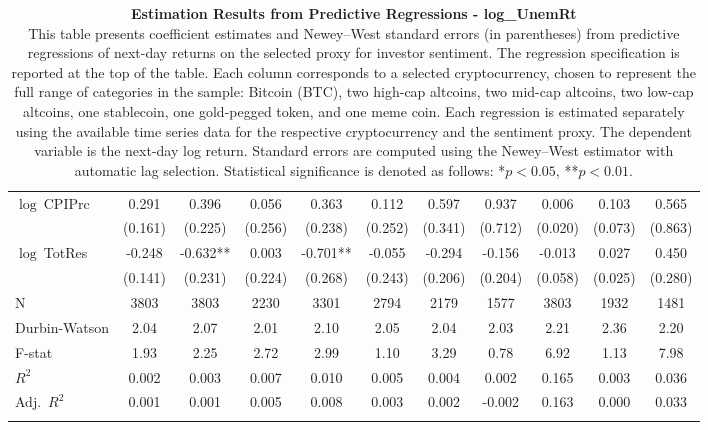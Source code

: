 \begin{table}[ht]
\begin{tabular}{l *{10}{c}}
\addlinespace
$\log\ $CPIPrc & 0.291 & 0.396 & 0.056 & 0.363 & 0.112 & 0.597 & 0.937 & 0.006 & 0.103 & 0.565 \\
 & (0.161) & (0.225) & (0.256) & (0.238) & (0.252) & (0.341) & (0.712) & (0.020) & (0.073) & (0.863) \\
\addlinespace
$\log\ $TotRes & -0.248 & -0.632** & 0.003 & -0.701** & -0.055 & -0.294 & -0.156 & -0.013 & 0.027 & 0.450 \\
 & (0.141) & (0.231) & (0.224) & (0.268) & (0.243) & (0.206) & (0.204) & (0.058) & (0.025) & (0.280) \\
\addlinespace
\midrule
N & 3803 & 3803 & 2230 & 3301 & 2794 & 2179 & 1577 & 3803 & 1932 & 1481 \\
Durbin-Watson & 2.04 & 2.07 & 2.01 & 2.10 & 2.05 & 2.04 & 2.03 & 2.21 & 2.36 & 2.20 \\
F-stat & 1.93 & 2.25 & 2.72 & 2.99 & 1.10 & 3.29 & 0.78 & 6.92 & 1.13 & 7.98 \\
\(R^2\) & 0.002 & 0.003 & 0.007 & 0.010 & 0.005 & 0.004 & 0.002 & 0.165 & 0.003 & 0.036 \\
Adj.\ \(R^2\) & 0.001 & 0.001 & 0.005 & 0.008 & 0.003 & 0.002 & -0.002 & 0.163 & 0.000 & 0.033 \\
\addlinespace
\midrule
\multicolumn{11}{c}{Specification tested: $R_{i,t+1} = \alpha_i + \beta_{sent} S_t + \phi R_{i,t} + \theta B_{i,t} + \gamma M_t + \varepsilon_{i,t+1}$}\\
\bottomrule
\end{tabular}
\caption{\textbf{Estimation Results from Predictive Regressions - log_UnemRt} \\
This table presents coefficient estimates and Newey--West standard errors (in parentheses) from predictive regressions of next-day returns on the selected proxy for investor sentiment. The regression specification is reported at the top of the table. Each column corresponds to a selected cryptocurrency, chosen to represent the full range of categories in the sample: Bitcoin (BTC), two high-cap altcoins, two mid-cap altcoins, two low-cap altcoins, one stablecoin, one gold-pegged token, and one meme coin. Each regression is estimated separately using the available time series data for the respective cryptocurrency and the sentiment proxy. The dependent variable is the next-day log return. Standard errors are computed using the Newey--West estimator with automatic lag selection. Statistical significance is denoted as follows: *$p<0.05$, **$p<0.01$.}
\label{tab:log_unemrt_result_h1}
\end{table}
